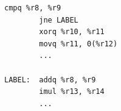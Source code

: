 \documentclass[tikz]{standalone}
\begin{document}
\begin{lrbox}{\codeBoxA}
\begin{lstlisting}[style=size10]
        cmpq %r8, %r9
        jne LABEL
        xorq %r10, %r11
        movq %r11, 0(%r12)
        ...

LABEL:  addq %r8, %r9
        imul %r13, %r14
        ...
\end{lstlisting}
\end{lrbox}



\end{document}
